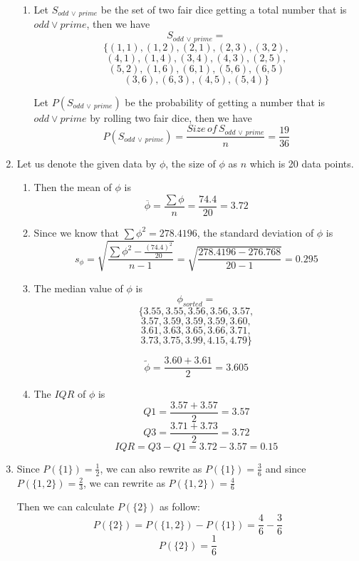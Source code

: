 \documentclass[12pt]{article}
\begin{document}
\begin{enumerate}
\begin{enumerate}
		\item Let $S_{odd \, \lor \, prime}$ be the set of two fair dice getting a total number that is $odd \lor prime$, then we have
		$$S_{odd \, \lor \, prime} =$$ 
		$$\{(1,1), (1,2), (2,1), (2,3), (3,2),$$		
		$$(4,1), (1,4),(3,4), (4,3), (2,5),$$
		$$(5,2), (1,6), (6,1), (5,6), (6,5)$$
		$$(3,6), (6,3), (4,5), (5,4) \}$$
		
		Let $P(S_{odd \, \lor \, prime})$ be the probability of getting a number that is $odd \lor prime$ by rolling two fair dice, then we have
		$$P(S_{odd \, \lor \, prime}) = \frac{Size \, of \, S_{odd \, \lor \, prime}}{n} = \frac{19}{36}$$
		
	\end{enumerate}
	
	\item Let us denote the given data by $\phi$, the size of $\phi$ as $n$ which is 20 data points.
	
	\begin{enumerate}
	
		\item Then the mean of $\phi$ is
		$$\overline{\phi} = \frac{\sum \phi}{n} = \frac{74.4}{20} = 3.72$$
		
		\item Since we know that $\sum \phi^{2} = 278.4196$, the standard deviation of $\phi$ is
		$$s_{\phi} = \sqrt{\frac{\sum \phi^{2} - \frac{(74.4)^2}{20}}{n-1}}= \sqrt{\frac{278.4196 - 276.768}{20-1}} = 0.295$$
		
		\item The median value of $\phi$ is
		$$\phi_{sorted} =$$	
		$$\{3.55, 3.55, 3.56, 3.56, 3.57,$$
		$$3.57, 3.59, 3.59, 3.59, 3.60,$$
		$$3.61, 3.63, 3.65, 3.66, 3.71,$$
		$$3.73, 3.75, 3.99, 4.15, 4.79\}$$
		
		$$\tilde{\phi} = \frac{3.60 + 3.61}{2} = 3.605$$
		
		\item The $IQR$ of $\phi$ is
		$$Q1 = \frac{3.57 + 3.57}{2} = 3.57$$
		$$Q3 = \frac{3.71 + 3.73}{2} = 3.72$$
		$$IQR = Q3 - Q1 = 3.72 - 3.57 = 0.15$$
	\end{enumerate}
		
	\item Since $P(\{1\}) = \frac{1}{2}$, we can also rewrite as $P(\{1\}) = \frac{3}{6}$ and since $P(\{1, 2\}) = \frac{2}{3}$, we can rewrite as $P(\{1, 2\}) = \frac{4}{6}$
	
	Then we can calculate $P(\{2\})$ as follow:
	$$P(\{2\}) = P(\{1, 2\}) - P(\{1\}) = \frac{4}{6} - \frac{3}{6}$$
	$$P(\{2\}) = \frac{1}{6}$$
	

\end{enumerate}
\end{document}
